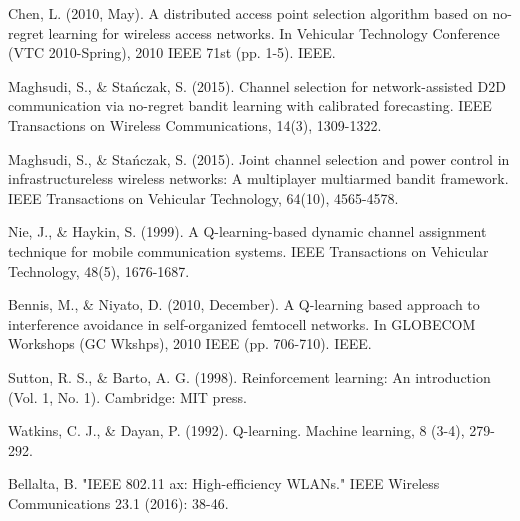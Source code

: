 \documentclass[conference]{IEEEtran}
\begin{document}
	\begin{thebibliography}{20}
		
		 Chen, L. (2010, May). A distributed access point selection algorithm based on no-regret learning for wireless access networks. In Vehicular Technology Conference (VTC 2010-Spring), 2010 IEEE 71st (pp. 1-5). IEEE.
		
		 Maghsudi, S., \& Stańczak, S. (2015). Channel selection for network-assisted D2D communication via no-regret bandit learning with calibrated forecasting. IEEE Transactions on Wireless Communications, 14(3), 1309-1322.	
		
		 Maghsudi, S., \& Stańczak, S. (2015). Joint channel selection and power control in infrastructureless wireless networks: A multiplayer multiarmed bandit framework. IEEE Transactions on Vehicular Technology, 64(10), 4565-4578.
		
		 Nie, J., \& Haykin, S. (1999). A Q-learning-based dynamic channel assignment technique for mobile communication systems. IEEE Transactions on Vehicular Technology, 48(5), 1676-1687.
		
		 Bennis, M., \& Niyato, D. (2010, December). A Q-learning based approach to interference avoidance in self-organized femtocell networks. In GLOBECOM Workshops (GC Wkshps), 2010 IEEE (pp. 706-710). IEEE.

		 Sutton, R. S., \& Barto, A. G. (1998). Reinforcement learning: An introduction (Vol. 1, No. 1). Cambridge: MIT press.
		
		 Watkins, C. J., \& Dayan, P. (1992). Q-learning. Machine learning, 8 (3-4), 279-292.
		
		 Bellalta, B. "IEEE 802.11 ax: High-efficiency WLANs." IEEE Wireless Communications 23.1 (2016): 38-46.  
		
	\end{thebibliography}	
	
\end{document}
